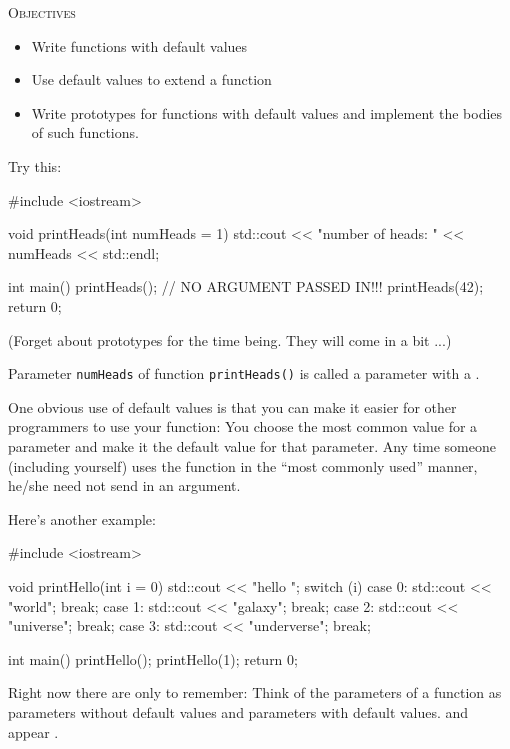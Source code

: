 \newpage{}

\textsc{Objectives}
\begin{itemize}
\item Write functions with default values
\item Use default values to extend a function
\item Write prototypes for functions with default values and implement the bodies of such functions.
\end{itemize}


\newpage{}

Try this:

\begin{consolethree}[escapeinside=||]
#include <iostream>

void printHeads(int numHeads = 1)
{
    std::cout << "number of heads: " << numHeads
              << std::endl;
}

int main()
{
    printHeads(); // NO ARGUMENT PASSED IN!!!
    printHeads(42);
    return 0;
}
\end{consolethree}

(Forget about prototypes for the time being. They will come in a bit ...)

Parameter \texttt{numHeads} of function \texttt{printHeads()} is called a parameter with a .

One obvious use of default values is that you can make it easier for other programmers to use your function: You choose the most common value for a parameter and make it the default value for that parameter. Any time someone (including yourself) uses the function in the ``most commonly used'' manner, he/she need not send in an argument.

Here's another example:

\begin{consolethree}[escapeinside=||]
#include <iostream>

void printHello(int i = 0)
{
    std::cout << "hello ";
    switch (i)
    {
        case 0: std::cout << "world\n"; break;
        case 1: std::cout << "galaxy\n"; break;
        case 2: std::cout << "universe\n"; break;
        case 3: std::cout << "underverse\n"; break;
    }
}

int main()
{
    printHello();
    printHello(1);
    return 0;
}
\end{consolethree}

Right now there are only  to remember: Think of the parameters of a function as parameters without default values and parameters with default values.  and appear .

